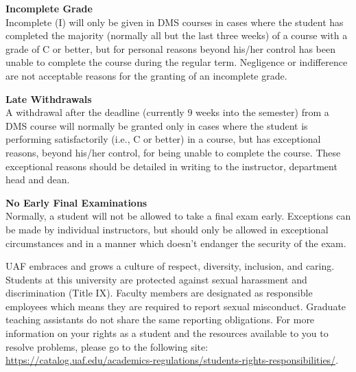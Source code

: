 \documentclass[12pt]{article}
\renewcommand{\emph}[1]{\textsf{\textbf{#1}}}
\newcommand{\localhead}[1]{\par\smallskip\textbf{#1}\nobreak\\}%
\def\subheading#1{\localhead{\emph{#1}}}
\begin{document}
\subheading{Incomplete Grade} 
Incomplete (I) will only be given in
  DMS courses in cases where
  the student has completed the majority (normally all but the last
  three weeks) of a course with a grade of C or better, but for
  personal reasons beyond his/her control has been unable to complete
  the course during the regular term. Negligence or indifference are
  not acceptable reasons for the granting of an incomplete
  grade. 

\subheading{Late Withdrawals} 
A withdrawal after the deadline
  (currently 9 weeks into the semester) from a DMS course will
  normally be granted only in cases where the student is performing
  satisfactorily (i.e., C or better) in a course, but has exceptional
  reasons, beyond his/her control, for being unable to complete the
  course. These exceptional reasons should be detailed in writing to
  the instructor, department head and dean.

\subheading{No Early Final Examinations}
 Normally, a student will not be
  allowed to take a final exam early. Exceptions can be made by
  individual instructors, but should only be allowed in exceptional
  circumstances and in a manner which doesn't endanger the security of
  the exam.


 




 UAF embraces and grows a culture of respect, diversity, inclusion, and caring. Students at this university are protected against sexual harassment and discrimination (Title IX). Faculty members are designated as responsible employees which means they are required to report sexual misconduct. Graduate teaching assistants do not share the same reporting obligations. For more information on your rights as a student and the resources available to you to resolve problems, please go to the following site: \url{https://catalog.uaf.edu/academics-regulations/students-rights-responsibilities/}.
\end{document}
